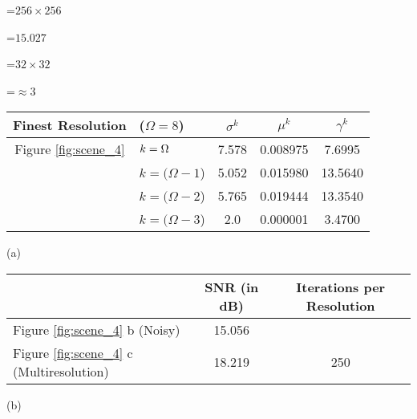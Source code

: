 {\newpage
\clearpage
\samepage \setbox\sizebox=\hbox{$256 \times 256$}\box\sizebox
}

{\newpage
\clearpage
\samepage \setbox\sizebox=\hbox{$15.027$}\box\sizebox
}

{\newpage
\clearpage
\samepage \setbox\sizebox=\hbox{$32 \times 32$}\box\sizebox
}

{\newpage
\clearpage
\samepage \setbox\sizebox=\hbox{$\approx 3$}\box\sizebox
}

{\newpage
\clearpage
\samepage \begin{table}%
\begin{center}
 
\begin{tabular}{||cl||c|c|c||} \hline \hline
Finest Resolution &($\Omega=8$)& $\sigma^k$ & $\mu^k$  & $\gamma^k$ \\  
\hline \hline
 Figure \ref{fig:scene_4}        & $k=\Omega$ & 7.578 &0.008975 & 7.6995 \\ 
             &$k=(\Omega
 -1$) & 5.052 &0.015980 &13.5640\\ 
             &$k=(\Omega
 -2$) & 5.765 &0.019444& 13.3540\\ 
             &$k=(\Omega
 -3$) & 2.0    &0.000001&  3.4700 \\  \hline \hline
\end{tabular}
\centerline{(a)} 

\vspace{1ex}

 \begin{tabular}{||l||c|c||} \hline   \hline
& SNR (in dB)& Iterations per Resolution \\  \hline \hline
 Figure \ref{fig:scene_4}  b (Noisy) &  15.056  &      \\  \hline
 Figure \ref{fig:scene_4}  c (Multiresolution)& 18.219   & 250 \\  \hline \hline
 \end{tabular}
 \centerline{(b)}
 
 \label{tab:scene_4}
 \end{center}
 
 \end{table}
}

